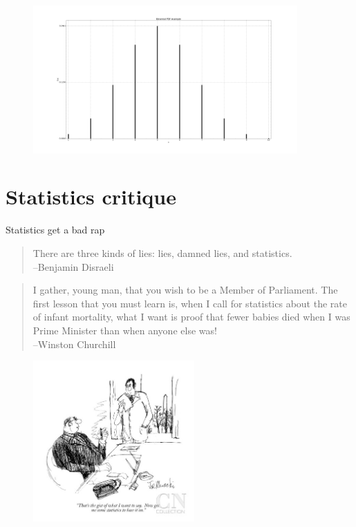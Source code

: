 \documentclass[aspectratio=1610,pdftex,dvipsnames,compress,xcolor={dvipsnames}]{beamer}
\begin{document}
\begin{frame}{}
    \begin{figure}
        \centering
        \includegraphics[width=0.90\textwidth]{binomial.pdf.png}
    \end{figure}
\end{frame}


\section{Statistics critique}


\addtocounter{framenumber}{-1}
\begin{frame}{Statistics get a bad rap}
    \begin{quote}
        There are three kinds of lies:  lies, damned lies, and statistics.\\
        --Benjamin Disraeli
    \end{quote}

    \vspace{0.25in}

    \begin{quote}
        I gather, young man, that you wish to be a Member of Parliament. The first lesson that you must learn is, when I call for statistics about the rate of infant mortality, what I want is proof that fewer babies died when I was Prime Minister than when anyone else was!\\
        --Winston Churchill
    \end{quote}
\end{frame}


\begin{frame}{}
    \begin{figure}
        \centering
        \includegraphics[width=0.55\textwidth]{cartoon.jpg}
    \end{figure}
\end{frame}
\end{document}
